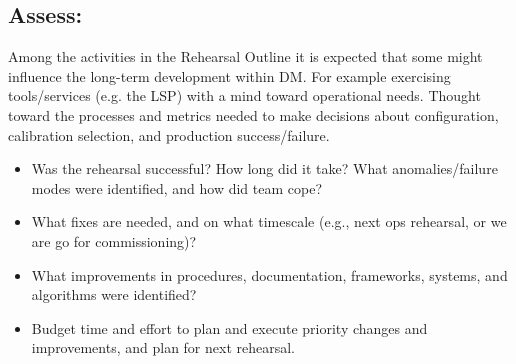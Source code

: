
%
%

\subsection{Assess:}

Among the activities in the Rehearsal Outline it is expected that some might influence the long-term development
within DM.  For example exercising tools/services (e.g. the LSP) with a mind toward operational needs.  Thought
toward the processes and metrics needed to make decisions about configuration, calibration selection, 
and production success/failure. 

\begin{itemize}
\item Was the rehearsal successful? How long did it take? What anomalies/failure modes were identified, and how did team cope? 
\item What fixes are needed, and on what timescale (e.g., next ops rehearsal, or we are go for commissioning)? 
\item What improvements in procedures, documentation, frameworks, systems, and algorithms were identified?
\item Budget time and effort to plan and execute priority changes and improvements, and plan for next rehearsal.
\end{itemize}


%
%
%

